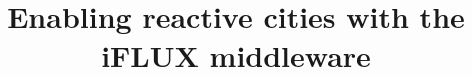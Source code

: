 \documentclass{sig-alternate}
\begin{document}
\title{Enabling reactive cities with the iFLUX middleware}

%
%
%
%
%
\end{document}
